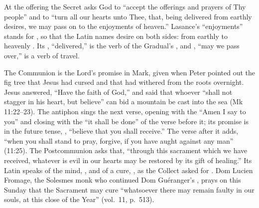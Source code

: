 At the offering the Secret asks God to ``accept the offerings and prayers of
Thy people'' and to ``turn all our hearts unto Thee, that, being delivered
from earthly desires, we may pass on to the enjoyments of heaven.'' Lasance's
``enjoyments'' stands for , so that the Latin names desire
on both sides: from earthly  to heavenly
. Its , ``delivered,'' is the verb of the
Gradual's , and , ``may we pass over,'' is
a verb of travel.

The Communion is the Lord's promise in Mark, given when Peter pointed out the
fig tree that Jesus had cursed and that had withered from the roots
overnight. Jesus answered, ``Have the faith of God,'' and said that whoever
``shall not stagger in his heart, but believe'' can bid a mountain be cast
into the sea (Mk 11:22--23). The antiphon sings the next verse, opening with
the ``Amen I say to you'' and closing with the ``it shall be done'' of the
verse before it; its promise is in the future tense, , ``believe that you shall receive.'' The verse after it adds,
``when you shall stand to pray, forgive, if you have aught against any man''
(11:25). The Postcommunion asks that, ``through this sacrament which we have
received, whatever is evil in our hearts may be restored by its gift of
healing.'' Its Latin speaks of the mind, , and of a cure,
, as the Collect asked for . Dom Lucien
Fromage, the Solesmes monk who continued Dom Guéranger's , prays on this Sunday that the Sacrament may cure ``whatsoever there may
remain faulty in our souls, at this close of the Year'' (vol.~11, p.~513).
